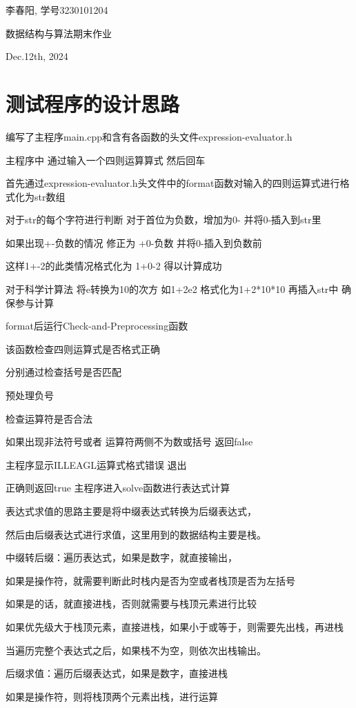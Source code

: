 \documentclass[UTF8]{ctexart}
\begin{document}
李春阳, 学号3230101204

{数据结构与算法期末作业}

Dec.12th, 2024

\section{测试程序的设计思路}

编写了主程序main.cpp和含有各函数的头文件expression-evaluator.h

主程序中 通过输入一个四则运算算式 然后回车

首先通过expression-evaluator.h头文件中的format函数对输入的四则运算式进行格式化为str数组

对于str的每个字符进行判断 对于首位为负数，增加为0- 并将0-插入到str里

如果出现+-负数的情况 修正为 +0-负数 并将0-插入到负数前 

这样1+-2的此类情况格式化为 1+0-2 得以计算成功

对于科学计算法 将e转换为10的次方 如1+2e2 格式化为1+2*10*10 再插入str中 确保参与计算

format后运行Check-and-Preprocessing函数

该函数检查四则运算式是否格式正确

分别通过检查括号是否匹配

预处理负号

检查运算符是否合法

如果出现非法符号或者 运算符两侧不为数或括号 返回false

主程序显示ILLEAGL运算式格式错误 退出

正确则返回true 主程序进入solve函数进行表达式计算

表达式求值的思路主要是将中缀表达式转换为后缀表达式，

然后由后缀表达式进行求值，这里用到的数据结构主要是栈。

中缀转后缀：遍历表达式，如果是数字，就直接输出，

如果是操作符，就需要判断此时栈内是否为空或者栈顶是否为左括号

如果是的话，就直接进栈，否则就需要与栈顶元素进行比较

如果优先级大于栈顶元素，直接进栈，如果小于或等于，则需要先出栈，再进栈

当遍历完整个表达式之后，如果栈不为空，则依次出栈输出。

后缀求值：遍历后缀表达式，如果是数字，直接进栈

如果是操作符，则将栈顶两个元素出栈，进行运算
\end{document}
